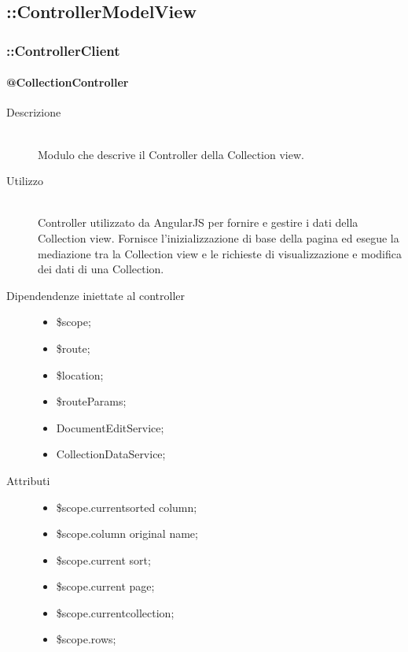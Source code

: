 \subsection{::ControllerModelView}

\subsubsection{::ControllerClient}

\paragraph{@CollectionController}
\begin{description}
 \item[Descrizione] \hfill \\
 Modulo che descrive il Controller della Collection view.
 
 \item[Utilizzo] \hfill \\
 Controller utilizzato da AngularJS per fornire e gestire i dati della Collection view.
 Fornisce l'inizializzazione di base della pagina ed esegue la mediazione tra la Collection view
 e le richieste di visualizzazione e modifica dei dati di una Collection.
 
 \item[Dipendendenze iniettate al controller] \hfill
 \begin{itemize}
  \item \$scope;
  \item \$route;
  \item \$location;
  \item \$routeParams;
  \item DocumentEditService;
  \item CollectionDataService;
 \end{itemize}
 
 \item[Attributi] \hfill
 \begin{itemize}
 \item \$scope.current\textunderscore sorted \textunderscore column;
 \item \$scope.column \textunderscore original \textunderscore name;
 \item \$scope.current \textunderscore sort;
 \item \$scope.current \textunderscore page;
 \item \$scope.current\textunderscore collection;
 \item \$scope.rows;
 \end{itemize}
 

\end{description}
